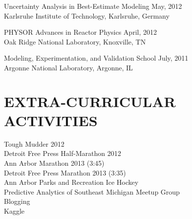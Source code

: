 \documentclass[margin, 10pt]{res} %
\begin{document}
\begin{resume}
Uncertainty Analysis in Best-Estimate Modeling \hfill May, 2012 \\
Karlsruhe Institute of Technology, Karlsruhe, Germany

PHYSOR Advances in Reactor Physics \hfill April, 2012 \\
Oak Ridge National Laboratory, Knoxville, TN

Modeling, Experimentation, and Validation School \hfill July, 2011 \\
Argonne National Laboratory, Argonne, IL


\section{EXTRA-CURRICULAR \\ ACTIVITIES} 

Tough Mudder 2012 \\
Detroit Free Press Half-Marathon 2012 \\
Ann Arbor Marathon 2013 (3:45) \\
Detroit Free Press Marathon 2013 (3:35) \\
Ann Arbor Parks and Recreation Ice Hockey \\
Predictive Analytics of Southeast Michigan Meetup Group \\
Blogging \\
Kaggle 


\end{resume}
\end{document}
